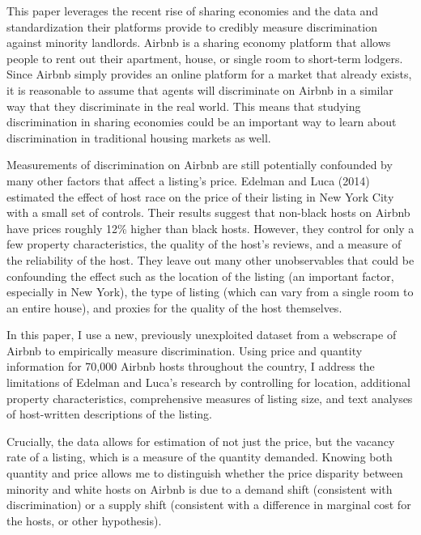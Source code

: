 This paper leverages the recent rise of sharing economies and the data and standardization their platforms provide to credibly measure discrimination against minority landlords. Airbnb is a sharing economy platform that allows people to rent out their apartment, house, or single room to short-term lodgers. Since Airbnb simply provides an online platform for a market that already exists, it is reasonable to assume that agents will discriminate on Airbnb in a similar way that they discriminate in the real world. This means that studying discrimination in sharing economies could be an important way to learn about discrimination in traditional housing markets as well.

Measurements of discrimination on Airbnb are still potentially confounded by many other factors that affect a listing's price. Edelman and Luca (2014) estimated the effect of host race on the price of their listing in New York City with a small set of controls. Their results suggest that non-black hosts on Airbnb have prices roughly 12\% higher than black hosts. However, they control for only a few property characteristics, the quality of the host's reviews, and a measure of the reliability of the host. They leave out many other unobservables that could be confounding the effect such as the location of the listing (an important factor, especially in New York), the type of listing (which can vary from a single room to an entire house), and proxies for the quality of the host themselves. %

In this paper, I use a new, previously unexploited dataset from a webscrape of Airbnb to empirically measure discrimination. Using price and quantity information for 70,000 Airbnb hosts throughout the country, I address the limitations of Edelman and Luca's research by controlling for location, additional property characteristics, comprehensive measures of listing size, and text analyses of host-written descriptions of the listing. 

Crucially, the data allows for estimation of not just the price, but the vacancy rate of a listing, which is a measure of the quantity demanded. Knowing both quantity and price allows me to distinguish whether the price disparity between minority and white hosts on Airbnb is due to a demand shift (consistent with discrimination) or a supply shift (consistent with a difference in marginal cost for the hosts, or other hypothesis). 

